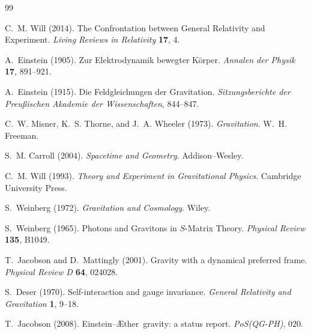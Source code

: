 \documentclass[12pt,a4paper]{article}
\newcommand{\Aether}{\AE ther}
\begin{document}

\begin{thebibliography}{99}

C.~M. Will (2014).
\newblock The Confrontation between General Relativity and Experiment.
\newblock \emph{Living Reviews in Relativity} \textbf{17}, 4.
\newblock {}

A.~Einstein (1905).
\newblock Zur Elektrodynamik bewegter K\"{o}rper.
\newblock \emph{Annalen der Physik} \textbf{17}, 891--921.
\newblock {}

A.~Einstein (1915).
\newblock Die Feldgleichungen der Gravitation.
\newblock \emph{Sitzungsberichte der Preu\ss{}ischen Akademie der
  Wissenschaften}, 844--847.

C.~W. Misner, K.~S. Thorne, and J.~A. Wheeler (1973).
\newblock \emph{Gravitation}.
\newblock W.~H. Freeman.

S.~M. Carroll (2004).
\newblock \emph{Spacetime and Geometry}.
\newblock Addison--Wesley.

C.~M. Will (1993).
\newblock \emph{Theory and Experiment in Gravitational Physics}.
\newblock Cambridge University Press.

S.~Weinberg (1972).
\newblock \emph{Gravitation and Cosmology}.
\newblock Wiley.

S.~Weinberg (1965).
\newblock Photons and Gravitons in $S$-Matrix Theory.
\newblock \emph{Physical Review} \textbf{135}, B1049.
\newblock {}

T.~Jacobson and D.~Mattingly (2001).
\newblock Gravity with a dynamical preferred frame.
\newblock \emph{Physical Review D} \textbf{64}, 024028.
\newblock {}

S.~Deser (1970).
\newblock Self-interaction and gauge invariance.
\newblock \emph{General Relativity and Gravitation} \textbf{1}, 9--18.
\newblock {}

T.~Jacobson (2008).
\newblock Einstein--\Aether\ gravity: a status report.
\newblock \emph{PoS(QG-PH)}, 020.
\newblock {}


\end{thebibliography}
\end{document}
